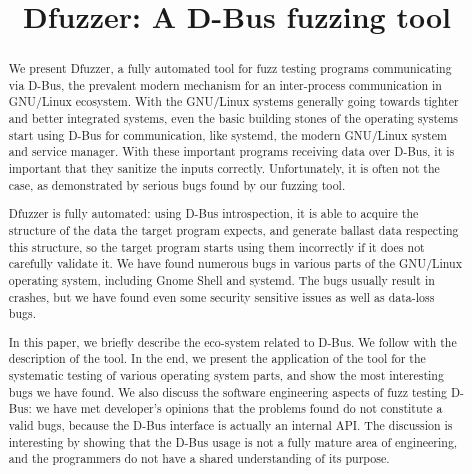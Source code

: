 \documentclass[conference]{IEEEtran}
\begin{document}
%
\title{\textbf{Dfuzzer: A D-Bus fuzzing tool}}


\author{
}

\maketitle


\begin{abstract}
We present Dfuzzer, a fully automated tool for fuzz testing
programs communicating via D-Bus, the prevalent modern mechanism for an
inter-process communication in GNU/Linux ecosystem. With the GNU/Linux systems
generally going towards tighter and better integrated systems, even the basic
building stones of the operating systems start using D-Bus for communication,
like systemd, the modern GNU/Linux system and service manager. With these
important programs receiving data over D-Bus, it is important that they
sanitize the inputs correctly. Unfortunately, it is often not the case, as
demonstrated by serious bugs found by our fuzzing tool.

Dfuzzer is fully automated: using D-Bus introspection, it is able to acquire
the structure of the data the target program expects, and generate ballast
data respecting this structure, so the target program starts using them
incorrectly if it does not carefully validate it. We have found numerous bugs
in various parts of the GNU/Linux operating system, including Gnome Shell and
systemd. The bugs usually result in crashes, but we have found even some
security sensitive issues as well as data-loss bugs.

In this paper, we briefly describe the eco-system related to D-Bus. We follow
with the description of the tool. In the end, we present the application of the
tool for the systematic testing of various operating system parts, and show the
most interesting bugs we have found. We also discuss the software engineering
aspects of fuzz testing D-Bus: we have met developer's opinions that the
problems found do not constitute a valid bugs, because the D-Bus interface is
actually an internal API. The discussion is interesting by showing that the
D-Bus usage is not a fully mature area of engineering, and the programmers do
not have a shared understanding of its purpose.

\end{abstract}
\end{document}
